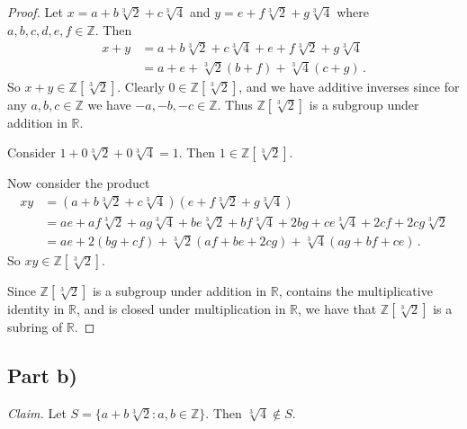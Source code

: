 \documentclass{abrice}
\newcommand{\Z}{\mathbb{Z}}
\newcommand{\R}{\mathbb{R}}
\begin{document}
\begin{proof}
  Let $x = a + b \sqrt[3]{2} + c \sqrt[3]{4}$ and $y = e + f \sqrt[3]{2} + g
  \sqrt[3]{4}$ where $a,b,c,d,e,f \in \Z$. Then
  \begin{align*}
    x + y
    &= a + b \sqrt[3]{2} + c \sqrt[3]{4} + e + f \sqrt[3]{2} + g \sqrt[3]{4} \\
    &= a + e + \sqrt[3]{2}(b + f) + \sqrt[3]{4}(c + g)\, .
  \end{align*}
  So $x + y \in \Z[\sqrt[3]{2}]$. Clearly $0 \in \Z[\sqrt[3]{2}]$, and we have
  additive inverses since for any $a,b,c \in \Z$ we have $-a,-b,-c \in \Z$. Thus
  $\Z[\sqrt[3]{2}]$ is a subgroup under addition in $\R$.

  Consider $1 + 0\sqrt[3]{2} + 0\sqrt[3]{4} = 1$. Then $1 \in \Z[\sqrt[3]{2}]$.

  Now consider the product
  \begin{align*}
    xy
    &= (a + b \sqrt[3]{2} + c \sqrt[3]{4})(e + f \sqrt[3]{2} + g \sqrt[3]{4}) \\
    &= ae + af \sqrt[3]{2} + ag \sqrt[3]{4} + be \sqrt[3]{2} + bf \sqrt[3]{4}
      + 2bg + ce \sqrt[3]{4} + 2cf + 2cg \sqrt[3]{2} \\
    &= ae + 2(bg + cf) + \sqrt[3]{2} (af + be + 2cg) + \sqrt[3]{4} (ag + bf + ce)\, .
  \end{align*}
  So $xy \in \Z[\sqrt[3]{2}]$.

  Since $\Z[\sqrt[3]{2}]$ is a subgroup under addition in $\R$, contains the
  multiplicative identity in $\R$, and is closed under multiplication in $\R$,
  we have that $\Z[\sqrt[3]{2}]$ is a subring of $\R$.
\end{proof}

\subsection{Part b)}

\emph{Claim.} Let $S = \{ a + b \sqrt[3]{2} : a,b \in \Z \}$. Then $\sqrt[3]{4}
\notin S$.
\end{document}
